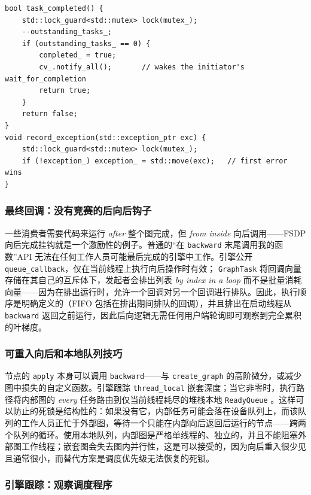 \begin{lstlisting}[caption={Completion accounting is identical for success and failure; only the initiating thread ever rethrows.}]
bool task_completed() {
    std::lock_guard<std::mutex> lock(mutex_);
    --outstanding_tasks_;
    if (outstanding_tasks_ == 0) {
        completed_ = true;
        cv_.notify_all();       // wakes the initiator's wait_for_completion
        return true;
    }
    return false;
}
void record_exception(std::exception_ptr exc) {
    std::lock_guard<std::mutex> lock(mutex_);
    if (!exception_) exception_ = std::move(exc);   // first error wins
}
\end{lstlisting}

\subsubsection{最终回调：没有竞赛的后向后钩子}
\label{subsubsec:finalcallbacks}

一些消费者需要代码来运行 \emph{after} 整个图完成，但 \emph{from inside} 向后调用——FSDP 向后完成挂钩就是一个激励性的例子。普通的“在 \texttt{backward} 末尾调用我的函数”API 无法在任何工作人员可能最后完成的引擎中工作。引擎公开 \texttt{queue\_callback}，仅在当前线程上执行向后操作时有效； \texttt{GraphTask} 将回调向量存储在其自己的互斥体下，发起者会排出列表 \emph{by index in a loop} 而不是批量消耗向量——因为在排出运行时，允许一个回调对另一个回调进行排队。因此，执行顺序是明确定义的（FIFO 包括在排出期间排队的回调），并且排出在启动线程从 \texttt{backward} 返回之前运行，因此后向逻辑无需任何用户端轮询即可观察到完全累积的叶梯度。

\subsubsection{可重入向后和本地队列技巧}
\label{subsubsec:reentrant}

节点的 \texttt{apply} 本身可以调用 \texttt{backward}——与 \texttt{create\_graph} 的高阶微分，或减少图中损失的自定义函数。引擎跟踪 \texttt{thread\_local} 嵌套深度；当它非零时，执行路径将内部图的 \emph{every} 任务路由到仅当前线程耗尽的堆栈本地 \texttt{ReadyQueue} 。这样可以防止的死锁是结构性的：如果没有它，内部任务可能会落在设备队列上，而该队列的工作人员正忙于外部图，等待一个只能在内部向后返回后运行的节点——跨两个队列的循环。使用本地队列，内部图是严格单线程的、独立的，并且不能阻塞外部图工作线程；嵌套图会失去图内并行性，这是可以接受的，因为向后重入很少见且通常很小，而替代方案是调度优先级无法恢复的死锁。

\subsubsection{引擎跟踪：观察调度程序}
\label{subsubsec:enginetrace}

